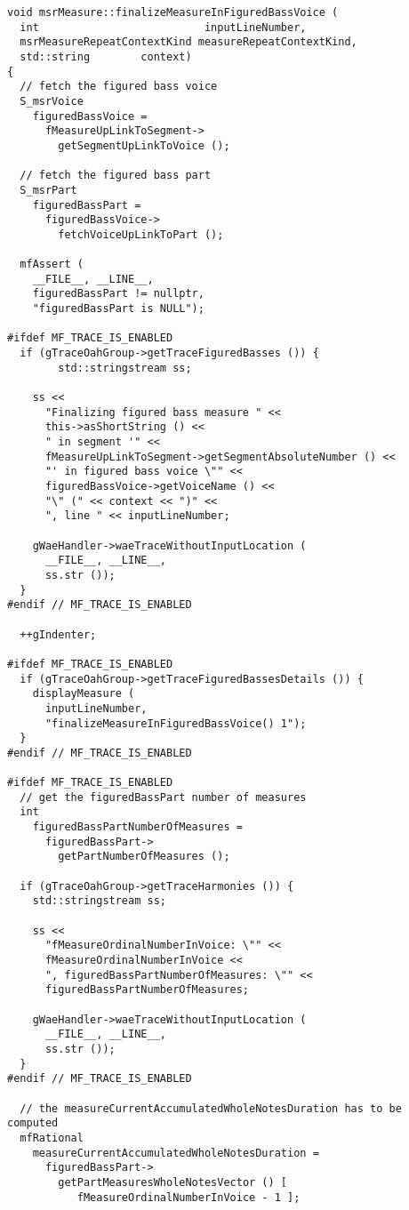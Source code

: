 \begin{lstlisting}[language=CPlusPlus]
void msrMeasure::finalizeMeasureInFiguredBassVoice (
  int                          inputLineNumber,
  msrMeasureRepeatContextKind measureRepeatContextKind,
  std::string        context)
{
  // fetch the figured bass voice
  S_msrVoice
    figuredBassVoice =
      fMeasureUpLinkToSegment->
        getSegmentUpLinkToVoice ();

  // fetch the figured bass part
  S_msrPart
    figuredBassPart =
      figuredBassVoice->
        fetchVoiceUpLinkToPart ();

  mfAssert (
    __FILE__, __LINE__,
    figuredBassPart != nullptr,
    "figuredBassPart is NULL");

#ifdef MF_TRACE_IS_ENABLED
  if (gTraceOahGroup->getTraceFiguredBasses ()) {
		std::stringstream ss;

    ss <<
      "Finalizing figured bass measure " <<
      this->asShortString () <<
      " in segment '" <<
      fMeasureUpLinkToSegment->getSegmentAbsoluteNumber () <<
      "' in figured bass voice \"" <<
      figuredBassVoice->getVoiceName () <<
      "\" (" << context << ")" <<
      ", line " << inputLineNumber;

    gWaeHandler->waeTraceWithoutInputLocation (
      __FILE__, __LINE__,
      ss.str ());
  }
#endif // MF_TRACE_IS_ENABLED

  ++gIndenter;

#ifdef MF_TRACE_IS_ENABLED
  if (gTraceOahGroup->getTraceFiguredBassesDetails ()) {
    displayMeasure (
      inputLineNumber,
      "finalizeMeasureInFiguredBassVoice() 1");
  }
#endif // MF_TRACE_IS_ENABLED

#ifdef MF_TRACE_IS_ENABLED
  // get the figuredBassPart number of measures
  int
    figuredBassPartNumberOfMeasures =
      figuredBassPart->
        getPartNumberOfMeasures ();

  if (gTraceOahGroup->getTraceHarmonies ()) {
    std::stringstream ss;

    ss <<
      "fMeasureOrdinalNumberInVoice: \"" <<
      fMeasureOrdinalNumberInVoice <<
      ", figuredBassPartNumberOfMeasures: \"" <<
      figuredBassPartNumberOfMeasures;

    gWaeHandler->waeTraceWithoutInputLocation (
      __FILE__, __LINE__,
      ss.str ());
  }
#endif // MF_TRACE_IS_ENABLED

  // the measureCurrentAccumulatedWholeNotesDuration has to be computed
  mfRational
    measureCurrentAccumulatedWholeNotesDuration =
      figuredBassPart->
        getPartMeasuresWholeNotesVector () [
           fMeasureOrdinalNumberInVoice - 1 ];


\end{lstlisting}
